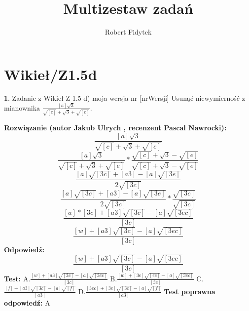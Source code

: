 \documentclass[12pt, a4paper]{article}
\title{Multizestaw zadań}
\author{Robert Fidytek}
\date{}
\theoremstyle{definition} %
\newtheorem{zad}{}
\newcommand{\kategoria}[1]{\section{#1}} %
\newcommand{\zadStart}[1]{\begin{zad}#1\newline} %
\newcommand{\zadStop}{\end{zad}}   %
\newcommand{\rozwStart}[2]{\noindent \textbf{Rozwiązanie (autor #1 , recenzent #2): }\newline} %
\newcommand{\rozwStop}{\newline}                                            %
\newcommand{\odpStart}{\noindent \textbf{Odpowiedź:}\newline}    %
\newcommand{\odpStop}{\newline}                                             %
\newcommand{\testStart}{\noindent \textbf{Test:}\newline} %
\newcommand{\testStop}{\newline} %
\newcommand{\kluczStart}{\noindent \textbf{Test poprawna odpowiedź:}\newline} %
\newcommand{\kluczStop}{\newline} %
\begin{document}
\maketitle


\kategoria{Wikieł/Z1.5d}
\zadStart{Zadanie z Wikieł Z 1.5 d) moja wersja nr [nrWersji]}
Usunąć niewymierność z mianownika $\frac{[a]\sqrt{3}}{\sqrt{[c]}+\sqrt{3}+\sqrt{[e]}}$.
\zadStop
\rozwStart{Jakub Ulrych}{Pascal Nawrocki}
$$\frac{[a]\sqrt{3}}{\sqrt{[c]}+\sqrt{3}+\sqrt{[e]}}$$
$$\frac{[a]\sqrt{3}}{\sqrt{[c]}+\sqrt{3}+\sqrt{[e]}}*\frac{\sqrt{[c]}+\sqrt{3}-\sqrt{[e]}}{\sqrt{[c]}+\sqrt{3}-\sqrt{[e]}}$$
$$\frac{[a]\sqrt{[3c]}+[a3]-[a]\sqrt{[3e]}}{2\sqrt{[3c]}}$$
$$\frac{[a]\sqrt{[3c]}+[a3]-[a]\sqrt{[3e]}}{2\sqrt{[3c]}}*\frac{\sqrt{[3c]}}{\sqrt{[3c]}}$$
$$\frac{[a]*[3c]+[a3]\sqrt{[3c]}-[a]\sqrt{[3ec]}}{[3c]}$$
$$\frac{[w]+[a3]\sqrt{[3c]}-[a]\sqrt{[3ec]}}{[3c]}$$
\rozwStop
\odpStart
$$\frac{[w]+[a3]\sqrt{[3c]}-[a]\sqrt{[3ec]}}{[3c]}$$
\odpStop
\testStart
A.$\frac{[w]+[a3]\sqrt{[3c]}-[a]\sqrt{[3ec]}}{[3c]}$
B.$\frac{[w]+[3e]\sqrt{[ec]}-[a]\sqrt{[3ec]}}{[3c]}$
C.$\frac{[f]+[a3]\sqrt{[3c]}-[a]\sqrt{[f]}}{[a3]}$
D.$\frac{[3ec]+[3e]\sqrt{[3c]}-[a]\sqrt{[f]}}{[a3]}$
\testStop
\kluczStart
A
\kluczStop
\end{document}
